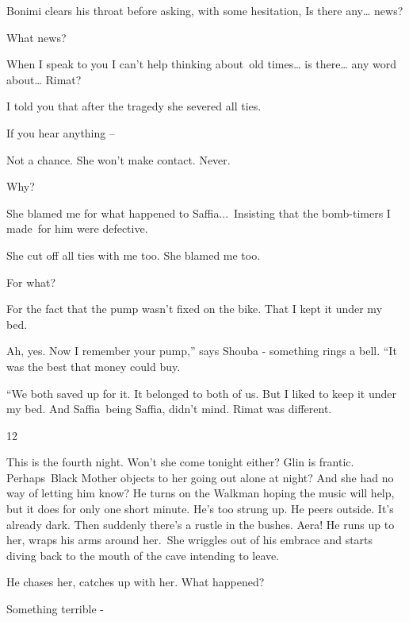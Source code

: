 \documentclass[twoside,11pt]{book}
\begin{document}
Bonimi clears his throat before asking, with some hesitation, {\textquotedbl} Is there any{\dots} news?{\textquotedbl} 

{\textquotedbl}What news?{\textquotedbl} 

{\textquotedbl}When I speak to you I can't help thinking about~old times{\dots} is there{\dots} any word about{\dots}
Rimat?{\textquotedbl} 

{\textquotedbl}I told you that after the tragedy she severed all ties.{\textquotedbl} 

{\textquotedbl}If you hear anything --{\textquotedbl} 

{\textquotedbl}Not a chance. She won't make contact. Never.{\textquotedbl} 

{\textquotedbl}Why?{\textquotedbl} 

{\textquotedbl}She blamed me for what happened to Saffia...\ Insisting that the bomb-timers I made\ for him were
defective.{\textquotedbl} 

{\textquotedbl}She cut off all ties with me too. She blamed me too.{\textquotedbl} 

{\textquotedbl}For what?{\textquotedbl}~ 

{\textquotedbl}For the fact that the pump wasn't fixed on the bike. That I kept it under my bed.{\textquotedbl} 

{\textquotedbl}Ah, yes. Now I remember your pump,'' says Shouba - something rings a bell. ``It was the best that money
could buy.{\textquotedbl}

{}``We both saved up for it. It belonged to both of us. But I liked to keep it under my bed. And Saffia~being Saffia,
didn't mind. Rimat was different.{\textquotedbl} 


\bigskip

12~

This is the fourth night. Won't she come tonight either? Glin is frantic. Perhaps~Black Mother objects to her going out
alone at night? And she had no way of letting him know? He turns on the Walkman hoping the music will help, but it does
for only one short minute. He's too strung up. He peers outside. It's already dark. Then suddenly there's a rustle in
the bushes. Aera! He runs up to her, wraps his arms around her.\ She wriggles out of his embrace and starts diving back
to the mouth of the cave intending to leave.

 He chases her, catches up with her. {\textquotedbl}What happened?{\textquotedbl} 

{\textquotedbl}Something terrible -{\textquotedbl} 
\end{document}
